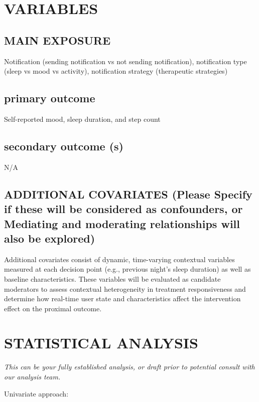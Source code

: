 \documentclass[11pt,letterpaper]{article}
\begin{document}
\section{VARIABLES}

\subsection{MAIN EXPOSURE}
Notification (sending notification vs not sending notification),
notification type (sleep vs mood vs activity),
notification strategy (therapeutic strategies)

\subsection{primary outcome}
Self-reported mood, sleep duration, and step count

\subsection{secondary outcome (s)}
N/A

\subsection{ADDITIONAL COVARIATES (Please Specify if these will be
  considered as confounders, or Mediating and moderating relationships
  will also be explored)}
Additional covariates consist of dynamic, time-varying contextual variables measured at each decision point (e.g., previous night's sleep duration) as well as baseline characteristics.
These variables will be evaluated as candidate moderators to assess contextual heterogeneity in treatment responsiveness and determine how real-time user state and characteristics affect the intervention effect on the proximal outcome.

\section{STATISTICAL ANALYSIS}
\textit{This can be your fully established analysis, or draft prior to
potential consult with our analysis team.}

Univariate approach:
\end{document}
